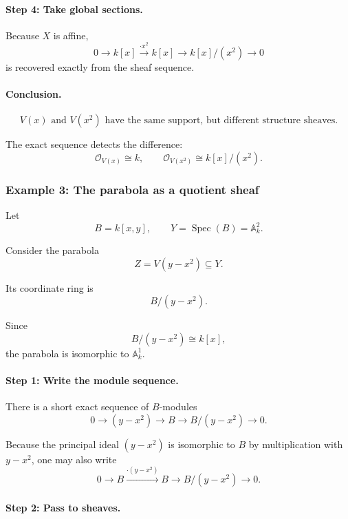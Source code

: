 \documentclass[12pt,a4paper]{article}
\theoremstyle{notespace}
\begin{document}
\paragraph{Step 4: Take global sections.}

Because \(X\) is affine,
\[
0
\longrightarrow
k[x]
\xrightarrow{\cdot x^{2}}
k[x]
\longrightarrow
k[x]/(x^{2})
\longrightarrow
0
\]
is recovered exactly from the sheaf sequence.

\paragraph{Conclusion.}

\[
\boxed{
	V(x)
	\text{ and }
	V(x^{2})
	\text{ have the same support, but different structure sheaves.}
}
\]

The exact sequence detects the difference:
\[
\mathcal{O}_{V(x)}\cong k,
\qquad
\mathcal{O}_{V(x^{2})}\cong k[x]/(x^{2}).
\]

\subsubsection{Example 3: The parabola as a quotient sheaf}

Let
\[
B=k[x,y],
\qquad
Y=\operatorname{Spec}(B)=\mathbb{A}^{2}_{k}.
\]

Consider the parabola
\[
Z=V(y-x^{2})\subseteq Y.
\]

Its coordinate ring is
\[
B/(y-x^{2}).
\]

Since
\[
B/(y-x^{2})\cong k[x],
\]
the parabola is isomorphic to \(\mathbb{A}^{1}_{k}\).

\paragraph{Step 1: Write the module sequence.}

There is a short exact sequence of \(B\)-modules
\[
0
\longrightarrow
(y-x^{2})
\longrightarrow
B
\longrightarrow
B/(y-x^{2})
\longrightarrow
0.
\]

Because the principal ideal \((y-x^{2})\) is isomorphic to \(B\) by
multiplication with \(y-x^{2}\), one may also write
\[
0
\longrightarrow
B
\xrightarrow{\cdot (y-x^{2})}
B
\longrightarrow
B/(y-x^{2})
\longrightarrow
0.
\]

\paragraph{Step 2: Pass to sheaves.}
\end{document}
